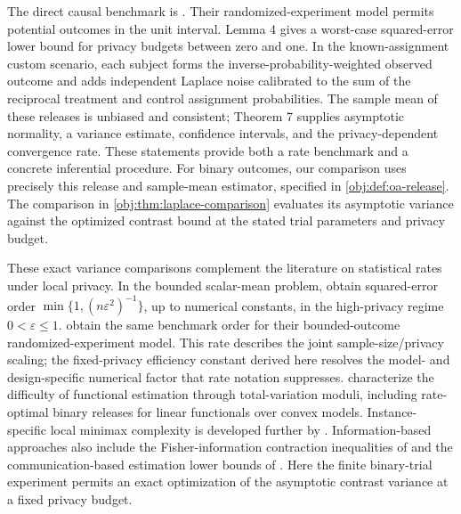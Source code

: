 \documentclass[11pt]{article}
\begin{document}
The direct causal benchmark is \citet[Sections 3.1 and 3.3, Lemma 4, Theorem 7, and Appendix A.5]{OhnishiAwan2025}. Their randomized-experiment model permits potential outcomes in the unit interval. Lemma 4 gives a worst-case squared-error lower bound for privacy budgets between zero and one. In the known-assignment custom scenario, each subject forms the inverse-probability-weighted observed outcome and adds independent Laplace noise calibrated to the sum of the reciprocal treatment and control assignment probabilities. The sample mean of these releases is unbiased and consistent; Theorem 7 supplies asymptotic normality, a variance estimate, confidence intervals, and the privacy-dependent convergence rate. These statements provide both a rate benchmark and a concrete inferential procedure. %
For binary outcomes, our comparison uses precisely this release and sample-mean estimator, specified in \cref{obj:def:oa-release}. The comparison in \cref{obj:thm:laplace-comparison} evaluates its asymptotic variance against the optimized contrast bound at the stated trial parameters and privacy budget.

These exact variance comparisons complement the literature on statistical rates under local privacy. In the bounded scalar-mean problem, \citet[Section 3.2.1]{DuchiJordanWainwright2018} obtain squared-error order \(\min\{1,(n\varepsilon^2)^{-1}\}\), up to numerical constants, in the high-privacy regime \(0<\varepsilon\le1\).  obtain the same benchmark order for their bounded-outcome randomized-experiment model. This rate describes the joint sample-size/privacy scaling; the fixed-privacy efficiency constant derived here resolves the model- and design-specific numerical factor that rate notation suppresses.  characterize the difficulty of functional estimation through total-variation moduli, including rate-optimal binary releases for linear functionals over convex models. Instance-specific local minimax complexity is developed further by \citet{Duchi2024}. %
Information-based approaches also include the Fisher-information contraction inequalities of \citet{BarnesChenOzgur2020} and the communication-based estimation lower bounds of \citet{Duchi2019}. %
Here the finite binary-trial experiment permits an exact optimization of the asymptotic contrast variance at a fixed privacy budget.
\end{document}
